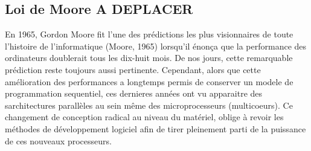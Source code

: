 \subsection{Loi de Moore A DEPLACER}
En 1965, Gordon Moore fit l'une des prédictions les plus visionnaires de toute l'histoire de l'informatique (Moore, 1965) lorsqu'il énonça que la performance des ordinateurs doublerait tous les dix-huit mois. De nos jours, cette remarquable prédiction reste toujours aussi pertinente. Cependant, alors que cette amélioration des performances a longtemps permis de conserver un modele de programmation sequentiel, ces dernieres années ont vu apparaitre des sarchitectures parallèles au sein même des microprocesseurs (multicoeurs). Ce changement de conception radical au niveau du matériel, oblige à revoir les méthodes de développement logiciel afin de tirer pleinement parti de la puissance de ces nouveaux processeurs.

